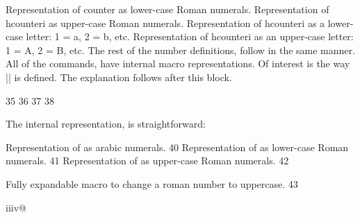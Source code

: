 \begin{macro}{\roman} 
\begin{macro}{\Roman}
\begin{macro}{\alph}
\begin{macro}{\Alph}
Representation of counter as lower-case Roman numerals.  Representation of hcounteri as upper-case Roman numerals.  Representation of hcounteri as a lower-case letter: 1 = a, 2 = b, etc.  Representation of hcounteri as an upper-case letter: 1 = A, 2 = B, etc.
The rest of the number definitions, follow in the same manner.  All of the commands, have internal macro representations. Of interest is the way |\Roman| is defined. The explanation follows after this block.
\end{macro}
\end{macro}
\end{macro}
\end{macro}

\begin{teXXX}
35 \def\roman#1{\expandafter\@roman\csname c@#1\endcsname}
36 \def\Roman#1{\expandafter\@Roman\csname c@#1\endcsname}
37 \def\alph#1{\expandafter\@alph\csname c@#1\endcsname}
38 \def\Alph#1{\expandafter\@Alph\csname c@#1\endcsname}
\end{teXXX}

The internal representation, is straightforward:

\begin{teXXX}
\@arabic \@arabic\FOOcounter Representation of \FOOcounter as arabic numerals.
40 \def\@arabic#1{\number #1} %
\@roman \@roman\FOOcounter Representation of \FOOcounter as lower-case Roman numerals.
41 \def\@roman#1{\romannumeral #1}
\@Roman \@Roman\FOOcounter Representation of \FOOcounter as upper-case Roman numerals.
42 \def\@Roman#1{\expandafter\@slowromancap\romannumeral #1@}
\end{teXXX}



\begin{teXXX}
\@slowromancap Fully expandable macro to change a roman number to uppercase.
43 \def\@slowromancap#1{\ifx @#1%
44 \else
45 \if i#1I\else\if v#1V\else\if x#1X\else\if l#1L\else\if
46 c#1C\else\if d#1D\else \if m#1M\else#1\fi\fi\fi\fi\fi\fi\fi
47 \expandafter\@slowromancap
48 \fi
49 }
\end{teXXX}



\makeatletter
\begin{teX}
\@slowromancap iiiv@ 
\end{teX}




